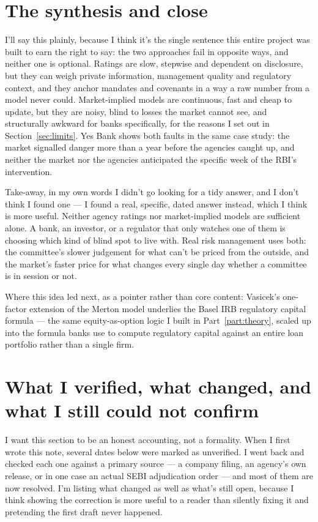 \section{The synthesis and close}
\label{sec:synth}
I'll say this plainly, because I think it's the single sentence this entire project was built to earn the right to say: the two approaches fail in opposite ways, and neither one is optional. Ratings are slow, stepwise and dependent on disclosure, but they can weigh private information, management quality and regulatory context, and they anchor mandates and covenants in a way a raw number from a model never could. Market-implied models are continuous, fast and cheap to update, but they are noisy, blind to losses the market cannot see, and structurally awkward for banks specifically, for the reasons I set out in Section~\ref{sec:limits}. Yes Bank shows both faults in the same case study: the market signalled danger more than a year before the agencies caught up, and neither the market nor the agencies anticipated the specific week of the RBI's intervention.

\begin{keybox}{Take-away, in my own words}
I didn't go looking for a tidy answer, and I don't think I found one — I found a real, specific, dated answer instead, which I think is more useful. Neither agency ratings nor market-implied models are sufficient alone. A bank, an investor, or a regulator that only watches one of them is choosing which kind of blind spot to live with. Real risk management uses both: the committee's slower judgement for what can't be priced from the outside, and the market's faster price for what changes every single day whether a committee is in session or not.
\end{keybox}

Where this idea led next, as a pointer rather than core content: Vasicek's one-factor extension of the Merton model underlies the Basel IRB regulatory capital formula — the same equity-as-option logic I built in Part~\ref{part:theory}, scaled up into the formula banks use to compute regulatory capital against an entire loan portfolio rather than a single firm.

\section{What I verified, what changed, and what I still could not confirm}
\label{sec:verify}
I want this section to be an honest accounting, not a formality. When I first wrote this note, several dates below were marked as unverified. I went back and checked each one against a primary source — a company filing, an agency's own release, or in one case an actual SEBI adjudication order — and most of them are now resolved. I'm listing what changed as well as what's still open, because I think showing the correction is more useful to a reader than silently fixing it and pretending the first draft never happened.

